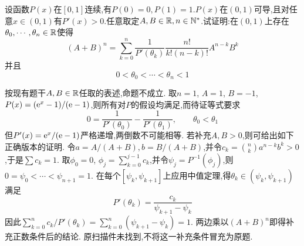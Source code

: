 \documentclass{ctexart}
\begin{document}
\begin{problem}[9.(15\songti{分})]
设函数$P(x)$在$[0,1]$连续,有$P(0)=0,P(1)=1$.$P(x)$在$(0,1)$可导,且对任意$x\in(0,1)$有$P'(x)>0$.任意取定$A,B\in\mathbb{R},n\in\mathbb{N}^*$.试证明:在$(0,1)$上存在$\theta_0,\cdots,\theta_n\in\mathbb{R}$使得
        \[(A+B)^n=\sum_{k=0}^n\dfrac{1}{P'(\theta_k)}\dfrac{n!}{k!(n-k)!}A^{n-k}B^k\]
        并且\[0<\theta_0<\cdots<\theta_n<1\]
\end{problem}
\begin{solution}
按现有题干$A,B\in\mathbb{R}$任取的表述,命题不成立.
取$n=1$, $A=1$, $B=-1$, $P(x)=(\mathrm{e}^x-1)/(\mathrm{e}-1)$,则所有对$P$的假设均满足,而待证等式要求
\[0=\dfrac1{P'(\theta_0)}-\dfrac1{P'(\theta_1)},\qquad \theta_0<\theta_1\]
但$P'(x)=\mathrm{e}^x/(\mathrm{e}-1)$严格递增,两倒数不可能相等.
若补充$A,B>0$,则可给出如下正确版本的证明.
令$a=A/(A+B),b=B/(A+B)$,并令$c_k=\binom nk a^{n-k}b^k>0$,于是$\sum c_k=1$.
取$\phi_0=0$, $\phi_j=\sum_{k=0}^{j-1}c_k$,并令$\psi_j=P^{-1}(\phi_j)$,则$0=\psi_0<\cdots<\psi_{n+1}=1$.
在每个$[\psi_k,\psi_{k+1}]$上应用中值定理,得$\theta_k\in(\psi_k,\psi_{k+1})$满足
\[P'(\theta_k)=\dfrac{c_k}{\psi_{k+1}-\psi_k}\]
因此$\sum_{k=0}^nc_k/P'(\theta_k)=\sum_{k=0}^n(\psi_{k+1}-\psi_k)=1$.
两边乘以$(A+B)^n$即得补充正数条件后的结论.
原扫描件未找到,不将这一补充条件冒充为原题.
\end{solution}
\end{document}
